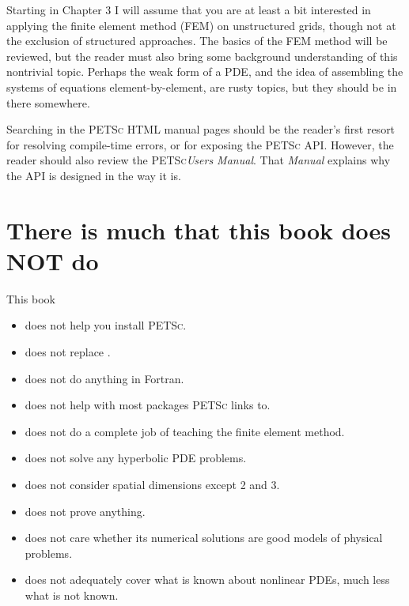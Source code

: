 \documentclass{tufte-book}
\theoremstyle{definition}
\newcommand{\PETSc}{\textsc{PETSc}\xspace}
\begin{document}
Starting in Chapter 3 I will assume that you are at least a bit interested in applying the finite element method (FEM) on unstructured grids, though not at the exclusion of structured approaches.  The basics of the FEM method will be reviewed, but the reader must also bring some background understanding of this nontrivial topic.  Perhaps the weak form of a PDE, and the idea of assembling the systems of equations element-by-element, are rusty topics, but they should be in there somewhere.

Searching in the \PETSc HTML manual pages should be the reader's first resort for resolving compile-time errors, or for exposing the \PETSc API.  However, the reader should also review the \PETSc \emph{Users Manual}.  That \emph{Manual} explains why the API is designed in the way it is.


\section{There is much that this book does NOT do}

This book\begin{itemize}
\item  does not help you install \PETSc.
\item  does not replace \citep{Smithetal1996}.
\item  does not do anything in Fortran.
\item  does not help with most packages \PETSc links to.
\item  does not do a complete job of teaching the finite element method.
\item  does not solve any hyperbolic PDE problems.
\item  does not consider spatial dimensions except 2 and 3.
\item  does not prove anything.
\item  does not care whether its numerical solutions are good models of physical problems.
\item  does not adequately cover what is known about nonlinear PDEs, much less what is not known.
\end{itemize}


\mainmatter



\end{document}

